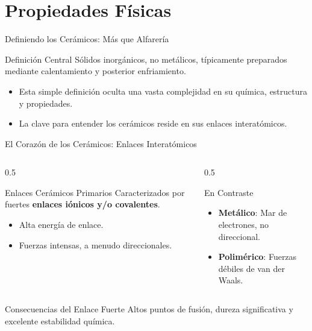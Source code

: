 \section{Propiedades Físicas}

\begin{frame}{Definiendo los Cerámicos: Más que Alfarería}
	\begin{block}{Definición Central}
		Sólidos inorgánicos, no metálicos, típicamente preparados mediante
		calentamiento y posterior enfriamiento.
	\end{block}

	\begin{itemize}
		\item Esta simple definición oculta una vasta complejidad en su química,
			estructura y propiedades.
		\item La clave para entender los cerámicos reside en sus enlaces
			interatómicos.
	\end{itemize}
\end{frame}

\begin{frame}{El Corazón de los Cerámicos: Enlaces Interatómicos}
	\begin{columns}[T]
		\begin{column}{0.5\textwidth}
			\begin{alertblock}{Enlaces Cerámicos Primarios}
				Caracterizados por fuertes \textbf{enlaces iónicos y/o covalentes}.
				\begin{itemize}
					\item Alta energía de enlace.
					\item Fuerzas intensas, a menudo direccionales.
				\end{itemize}
			\end{alertblock}
		\end{column}
		\begin{column}{0.5\textwidth}
			\begin{exampleblock}{En Contraste}
				\begin{itemize}
					\item \textbf{Metálico}: Mar de electrones, no direccional.
					\item \textbf{Polimérico}: Fuerzas débiles de van der Waals.
				\end{itemize}
			\end{exampleblock}
		\end{column}
	\end{columns}

	\begin{block}{Consecuencias del Enlace Fuerte}
		Altos puntos de fusión, dureza significativa y excelente estabilidad química.
	\end{block}
\end{frame}

